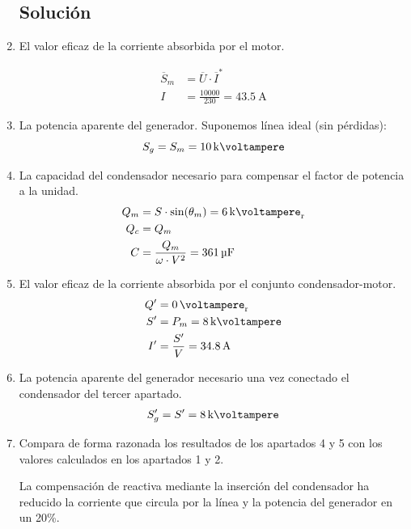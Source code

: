 \begin{enumerate}

\subsection*{Solución}

\item El valor eficaz de la corriente absorbida por el motor.


  \begin{align*}
  \overline{S}_m &= \overline{U} \cdot \overline{I}^*\\
%
  I &= \frac{\num{10000}}{230} = \qty{43.5}{\ampere}
\end{align*}

\item La potencia aparente del generador.
Suponemos línea ideal (sin pérdidas):
\[
  S_g = S_m = \qty{10}{\kilo\voltampere} 
\]

\item La capacidad del condensador necesario para compensar el factor de potencia a la unidad.
\begin{align*}
Q_m &= S \cdot \sin(\theta_m) = \qty{6}{\kilo\voltampere_r}\\
Q_c &= Q_m\\
C &= \frac{Q_m}{\omega \cdot V^2} = \qty{361}{\micro\farad}
\end{align*}

\item El valor eficaz de la corriente absorbida por el conjunto condensador-motor. 
\begin{align*}
Q' &= \qty{0}{\voltampere_r}\\
S' &= P_m = \qty{8}{\kilo\voltampere}\\
I' &= \frac{S'}{V} = \qty{34.8}{\ampere}
\end{align*}

\item La potencia aparente del generador necesario una vez conectado el condensador del tercer apartado.
\begin{align*}
S'_g &= S' = \qty{8}{\kilo\voltampere}\\
\end{align*}

\item Compara de forma razonada los resultados de los apartados 4 y 5 con los valores calculados en los apartados 1 y 2.

  La compensación de reactiva mediante la inserción del condensador ha reducido la corriente que circula por la línea y la potencia del generador en un 20\%.

\end{enumerate}

